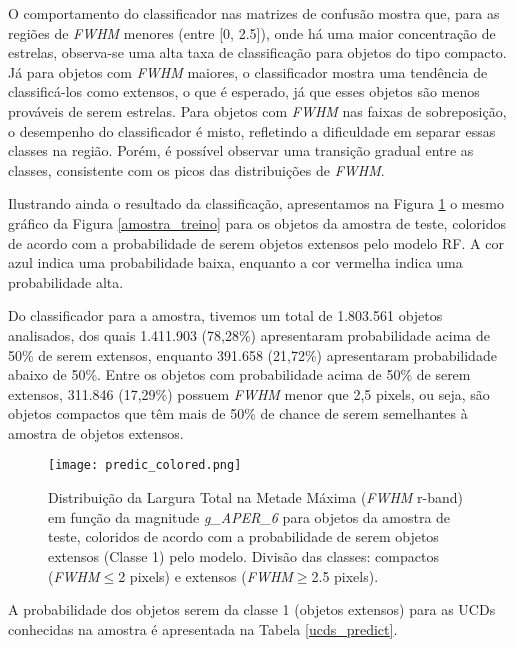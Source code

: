 O comportamento do classificador nas matrizes de confusão mostra que, para as regiões de \textit{FWHM} menores (entre [0, 2.5]), onde há uma maior concentração de estrelas, observa-se uma alta taxa de classificação para objetos do tipo compacto. Já para objetos com \textit{FWHM} maiores, o classificador mostra uma tendência de classificá-los como extensos, o que é esperado, já que esses objetos são menos prováveis de serem estrelas. Para objetos com \textit{FWHM} nas faixas de sobreposição, o desempenho do classificador é misto, refletindo a dificuldade em separar essas classes na região. Porém, é possível observar uma transição gradual entre as classes, consistente com os picos das distribuições de \textit{FWHM}.

Ilustrando ainda o resultado da classificação, apresentamos na Figura \ref{predic_colored} o mesmo gráfico da Figura \ref{amostra_treino} para os objetos da amostra de teste, coloridos de acordo com a probabilidade de serem objetos extensos pelo modelo RF. A cor azul indica uma probabilidade baixa, enquanto a cor vermelha indica uma probabilidade alta. 

Do classificador para a amostra, tivemos um total de 1.803.561 objetos analisados, dos quais 1.411.903 (78,28\%) apresentaram probabilidade acima de 50\% de serem extensos, enquanto 391.658 (21,72\%) apresentaram probabilidade abaixo de 50\%. Entre os objetos com probabilidade acima de 50\% de serem extensos, 311.846 (17,29\%) possuem \textit{FWHM} menor que 2,5 pixels, ou seja, são objetos compactos que têm mais de 50\% de chance de serem semelhantes à amostra de objetos extensos.

\begin{figure}[!ht]
    \centering
    \texttt{[image: predic\_colored.png]}
    \caption[]{Distribuição da Largura Total na Metade Máxima (\textit{FWHM} r-band) em função da magnitude \textit{g\_APER\_6} para objetos da amostra de teste, coloridos de acordo com a probabilidade de serem objetos extensos (Classe 1) pelo modelo. Divisão das classes: compactos (\textit{FWHM}$\leq$2 pixels) e extensos (\textit{FWHM}$\geq$2.5 pixels).}
    \label{predic_colored}
\end{figure}

A probabilidade dos objetos serem da classe 1 (objetos extensos) para as UCDs conhecidas na amostra é apresentada na Tabela \ref{ucds_predict}.

